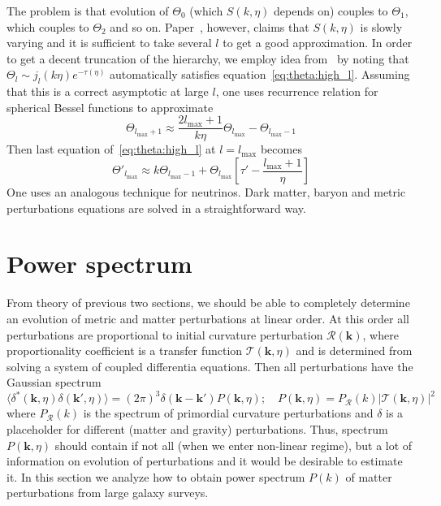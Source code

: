 \documentclass[12pt]{extarticle}
\numberwithin{problem}{section}
\numberwithin{theorem}{section}
\begin{document}
	The problem is that evolution of $\Theta_0$ (which $S(k, \eta)$ depends on) couples to $\Theta_1$, which couples to $\Theta_2$ and so on. Paper~\cite{seljak:1996}, however, claims that $S(k, \eta)$ is slowly varying and it is sufficient to take several $l$ to get a good approximation. In order to get a decent truncation of the hierarchy, we employ idea from~\cite{ma:1995} by noting that $\Theta_l\sim j_l(k\eta)e^{-\tau(\eta)}$ automatically satisfies equation~\ref{eq:theta:high_l}. Assuming that this is a correct asymptotic at large $l$, one uses recurrence relation for spherical Bessel functions to approximate
	\begin{equation}
		\Theta_{l_{\max} + 1}\approx \frac{2l_{\max} + 1}{k\eta}\Theta_{l_{\max}} - \Theta_{l_{\max} - 1}
	\end{equation}
	Then last equation of~\ref{eq:theta:high_l} at $l = l_{\max}$ becomes
	\begin{equation}
		\Theta'_{l_{\max}}\approx k\Theta_{l_{\max} - 1} + \Theta_{l_{\max}}\left[\tau' - \frac{l_{\max} + 1}{\eta}\right]
	\end{equation}
	One uses an analogous technique for neutrinos. Dark matter, baryon and metric perturbations equations are solved in a straightforward way.
	
	\section{Power spectrum}
	\label{sec:power}
	From theory of previous two sections, we should be able to completely determine an evolution of metric and matter perturbations at linear order. At this order all perturbations are proportional to initial curvature perturbation $\mathcal{R}(\mathbf{k})$, where proportionality coefficient is a transfer function $\mathcal{T}(\mathbf{k}, \eta)$ and is determined from solving a system of coupled differentia equations. Then all perturbations have the Gaussian spectrum
	\begin{equation}
		\langle\delta^*(\mathbf{k}, \eta)\delta(\mathbf{k}', \eta)\rangle = (2\pi)^3\delta(\mathbf{k} - \mathbf{k}')P(\mathbf{k}, \eta);\quad P(\mathbf{k}, \eta) = P_{\mathcal{R}}(k)|\mathcal{T}(\mathbf{k}, \eta)|^2
	\end{equation}
	where $P_{\mathcal{R}}(k)$ is the spectrum of primordial curvature perturbations and $\delta$ is a placeholder for different (matter and gravity) perturbations. Thus, spectrum $P(\mathbf{k}, \eta)$ should contain if not all (when we enter non-linear regime), but a lot of information on evolution of perturbations and it would be desirable to estimate it. In this section we analyze how to obtain power spectrum $P(k)$ of matter perturbations from large galaxy surveys.
	
\end{document}
